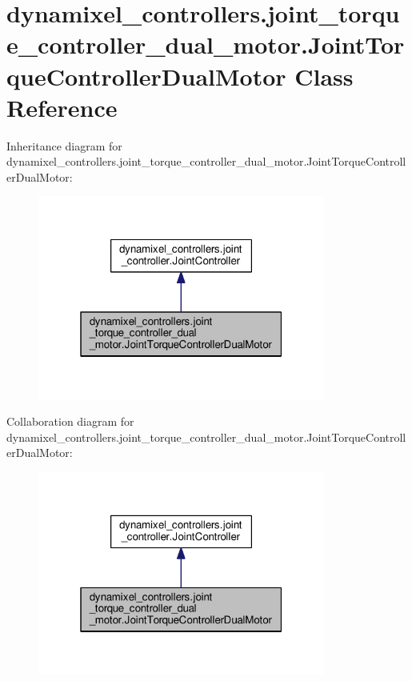 \hypertarget{classdynamixel__controllers_1_1joint__torque__controller__dual__motor_1_1_joint_torque_controller_dual_motor}{}\section{dynamixel\+\_\+controllers.\+joint\+\_\+torque\+\_\+controller\+\_\+dual\+\_\+motor.\+Joint\+Torque\+Controller\+Dual\+Motor Class Reference}
\label{classdynamixel__controllers_1_1joint__torque__controller__dual__motor_1_1_joint_torque_controller_dual_motor}


Inheritance diagram for dynamixel\+\_\+controllers.\+joint\+\_\+torque\+\_\+controller\+\_\+dual\+\_\+motor.\+Joint\+Torque\+Controller\+Dual\+Motor\+:
\nopagebreak
\begin{figure}[H]
\begin{center}
\leavevmode
\includegraphics[width=268pt]{d6/d44/classdynamixel__controllers_1_1joint__torque__controller__dual__motor_1_1_joint_torque_controller_dual_motor__inherit__graph}
\end{center}
\end{figure}


Collaboration diagram for dynamixel\+\_\+controllers.\+joint\+\_\+torque\+\_\+controller\+\_\+dual\+\_\+motor.\+Joint\+Torque\+Controller\+Dual\+Motor\+:
\nopagebreak
\begin{figure}[H]
\begin{center}
\leavevmode
\includegraphics[width=268pt]{da/d6d/classdynamixel__controllers_1_1joint__torque__controller__dual__motor_1_1_joint_torque_controller_dual_motor__coll__graph}
\end{center}
\end{figure}
